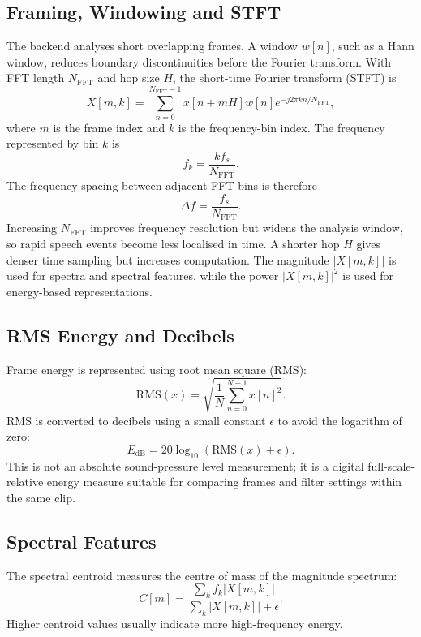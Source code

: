 ﻿\documentclass[11pt,a4paper]{article}
\begin{document}
\subsection{Framing, Windowing and STFT}
The backend analyses short overlapping frames. A window $w[n]$, such as a Hann window, reduces boundary discontinuities before the Fourier transform. With FFT length $N_{\mathrm{FFT}}$ and hop size $H$, the short-time Fourier transform (STFT) is
\begin{equation}
    X[m,k] = \sum_{n=0}^{N_{\mathrm{FFT}}-1} x[n+mH]w[n]e^{-j2\pi kn/N_{\mathrm{FFT}}},
\end{equation}
where $m$ is the frame index and $k$ is the frequency-bin index. The frequency represented by bin $k$ is
\begin{equation}
    f_k = \frac{k f_s}{N_{\mathrm{FFT}}}.
\end{equation}
The frequency spacing between adjacent FFT bins is therefore
\begin{equation}
    \Delta f = \frac{f_s}{N_{\mathrm{FFT}}}.
\end{equation}
Increasing $N_{\mathrm{FFT}}$ improves frequency resolution but widens the analysis window, so rapid speech events become less localised in time. A shorter hop $H$ gives denser time sampling but increases computation. The magnitude $|X[m,k]|$ is used for spectra and spectral features, while the power $|X[m,k]|^2$ is used for energy-based representations.

\subsection{RMS Energy and Decibels}
Frame energy is represented using root mean square (RMS):
\begin{equation}
    \mathrm{RMS}(x) = \sqrt{\frac{1}{N}\sum_{n=0}^{N-1} x[n]^2}.
\end{equation}
RMS is converted to decibels using a small constant $\epsilon$ to avoid the logarithm of zero:
\begin{equation}
    E_{\mathrm{dB}} = 20\log_{10}(\mathrm{RMS}(x)+\epsilon).
\end{equation}
This is not an absolute sound-pressure level measurement; it is a digital full-scale-relative energy measure suitable for comparing frames and filter settings within the same clip.

\subsection{Spectral Features}
The spectral centroid measures the centre of mass of the magnitude spectrum:
\begin{equation}
    C[m] = \frac{\sum_k f_k |X[m,k]|}{\sum_k |X[m,k]|+\epsilon}.
\end{equation}
Higher centroid values usually indicate more high-frequency energy.
\end{document}
